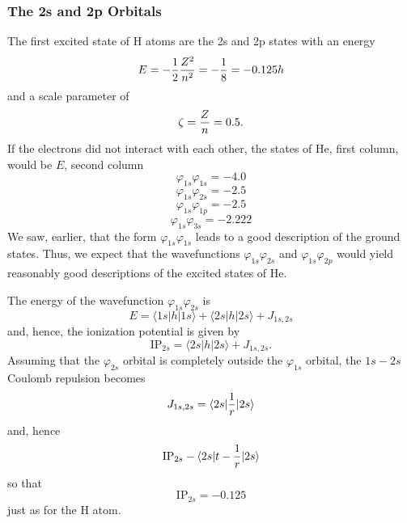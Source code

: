{\subsubsection{The 2s and 2p Orbitals}

The first excited state of H atoms are the 2s and 2p states with an energy
\begin{equation}
E = - {1 \over 2} {Z^2 \over n^2} = - {1 \over 8} = - 0.125h
\end{equation}
and a scale parameter of
\begin{equation}
\zeta = {Z \over n} = 0.5 .
\end{equation}
If the electrons did not interact with each other, the states of He, first 
column, would be $E$, second column
\begin{equation}
\varphi_{1s} \varphi_{1s} = - 4.0
\end{equation}
\begin{equation}
\varphi_{1s} \varphi_{2s} = - 2.5
\end{equation}
\begin{equation}
\varphi_{1s} \varphi_{1p} = - 2.5
\end{equation}
\begin{equation}
\varphi_{1s} \varphi_{3s} = - 2.222
\end{equation}
We saw, earlier, that the form $\varphi_{1s} \varphi_{1s}$ leads to a good 
description of the ground states.  Thus, we expect that the wavefunctions 
$\varphi_{1s} \varphi_{2s}$ and $\varphi_{1s} \varphi_{2p}$ would yield reasonably good
descriptions of the excited states of He.

The energy of the wavefunction $\varphi_{1s} \varphi_{2s}$ is
\begin{equation}
E = \langle 1s | h | 1s \rangle + \langle 2s | h | 2s \rangle + J_{1s,2s}
\end{equation}
and, hence, the ionization potential is given by
\begin{equation}
\mathrm{IP}_{2s} = \langle 2s | h | 2s \rangle + J_{1s,2s} .
\end{equation}
Assuming that the $\varphi_{2s}$ orbital is completely outside the 
$\varphi_{1s}$ orbital, the $1s-2s$ Coulomb repulsion becomes
\begin{equation}
J_{1s , 2s} = \langle 2s | {1 \over r} | 2s \rangle
\end{equation}
and, hence
\begin{equation}
\mathrm{IP}_{2s} - \langle 2s | t - {1 \over r} | 2s \rangle
\end{equation}
so that
\begin{equation}
\mathrm{IP}_{2s} = - 0.125
\end{equation}
just as for the H atom.

}
